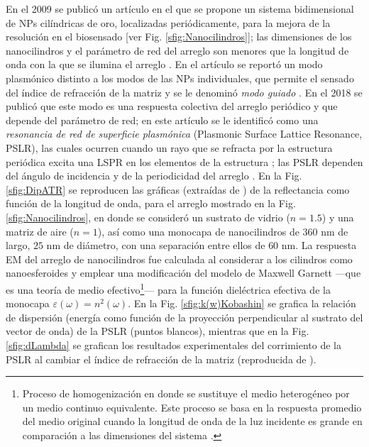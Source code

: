 En el 2009 se public\'o un art\'iculo \cite{kabashin2009plasmonic} en el que se propone un sistema bidimensional de NPs cilíndricas de oro, localizadas periódicamente, para la mejora de la resoluci\'on  en el biosensado [ver Fig. \ref{sfig:Nanocilindros}]; las dimensiones de los nanocilindros y el parámetro de red del arreglo son menores que la longitud de onda con la que se ilumina el arreglo \cite{kabashin2009plasmonic}.  En el artículo se reportó un modo plasmónico distinto a los modos de las NPs individuales, que permite el sensado del índice de refracción de la matriz y se le denominó \textit{modo guiado} \cite{kabashin2009plasmonic}.  En el 2018 se publicó que este modo es una respuesta colectiva del arreglo periódico \cite{danilov2018ultra} y que depende del parámetro de red; en este artículo se le identificó como una \emph{resonancia de red de superficie plasmónica} (Plasmonic Surface Lattice Resonance, PSLR), las cuales ocurren cuando un rayo que se refracta por la estructura periódica excita una LSPR en los elementos de la estructura \cite{vakevainen2013plasmonic}; las PSLR dependen del  ángulo de incidencia y de la periodicidad del arreglo \cite{danilov2018ultra}. En la Fig. \ref{sfig:DipATR} se reproducen las gráficas (extraídas de \cite{kabashin2009plasmonic}) de la reflectancia como función de la longitud de onda, para el arreglo mostrado en la Fig.  \ref{sfig:Nanocilindros}, en donde se consideró un sustrato de vidrio ($n=1.5$) y una matriz de aire ($n=1$), así como una monocapa de nanocilindros de $360$ nm de largo, $25$ nm de diámetro, con una separación entre ellos de $60$ nm. La respuesta EM del arreglo de nanocilindros   fue calculada al considerar a los cilindros como nanoesferoides y emplear una modificación del modelo de Maxwell Garnett \cite{atkinson2006anisotropic} ---que es una teoría de medio efectivo\footnote{Proceso de homogenización en donde se sustituye el medio heterogéneo por un medio continuo equivalente.  Este proceso se basa en la respuesta promedio del medio original cuando la longitud de onda de la luz incidente es grande en comparación a las dimensiones del sistema \cite{sihvola1999mixing}.}--- para la función dieléctrica efectiva de la monocapa $\varepsilon(\omega) = n^2 (\omega)$. En la Fig. \ref{sfig:k(w)Kobashin} se grafica la relación de dispersión  (energía como función de la  proyección perpendicular al sustrato del vector de onda) de la PSLR (puntos blancos), mientras que en la Fig.  \ref{sfig:dLambda} se grafican los resultados experimentales del corrimiento de la PSLR al cambiar el índice de refracción de la matriz (reproducida de \cite{danilov2018ultra}).

